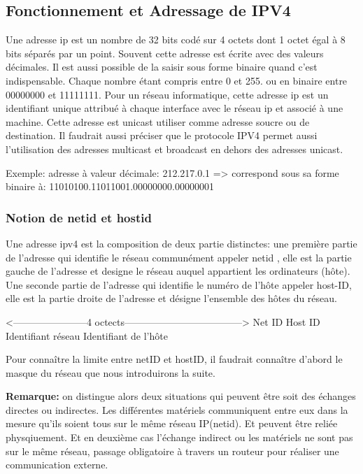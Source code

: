 
\subsection{Fonctionnement et Adressage de IPV4}
Une adresse ip est un nombre de 32 bits codé sur 4 octets dont 1 octet égal à 8
bits séparés par un point. Souvent cette adresse est écrite avec des valeurs
décimales.  Il est aussi possible de la saisir sous forme binaire quand c’est
indispensable. Chaque nombre étant compris entre 0 et 255. ou en binaire entre
00000000 et 11111111.  Pour un réseau informatique, cette adresse ip est un
identifiant unique attribué à chaque interface avec le réseau ip et associé à
une machine. Cette adresse est unicast utiliser comme adresse soucre ou de
destination. Il faudrait aussi préciser que le protocole IPV4 permet aussi
l’utilisation des adresses multicast et broadcast en dehors des adresses
unicast.

\vspace{1cm}
Exemple: adresse à valeur décimale: 212.217.0.1 => correspond sous sa forme
binaire à: 11010100.11011001.00000000.00000001
\vspace{1cm}

\subsubsection{Notion de netid et hostid}
Une adresse ipv4 est la composition de deux partie distinctes: une première
partie de l’adresse qui identifie le réseau communément appeler netid , elle
est la partie gauche de l’adresse et designe le réseau auquel appartient les
ordinateurs (hôte).  Une seconde partie de l’adresse qui identifie le numéro de
l’hôte appeler host-ID, elle est la partie droite de l’adresse et désigne
l’ensemble des hôtes du réseau.

\vspace{1cm} 
<-----------------------4 octects------------------------------------>
        Net ID                              Host ID
   Identifiant réseau               Identifiant de l’hôte
\vspace{1cm} 


Pour connaître la limite entre netID et hostID, il faudrait connaître d’abord
le masque du réseau que nous introduirons la suite.

\textbf{ Remarque:} on distingue alors deux situations qui peuvent être soit
des échanges directes ou indirectes.  Les différentes matériels communiquent
entre eux dans la mesure qu’ils soient tous sur le même réseau IP(netid). Et
peuvent être reliée physqiuement.  Et en deuxième cas l’échange indirect ou les
matériels ne sont pas sur le même réseau, passage obligatoire à travers un
routeur pour réaliser une communication externe.   

